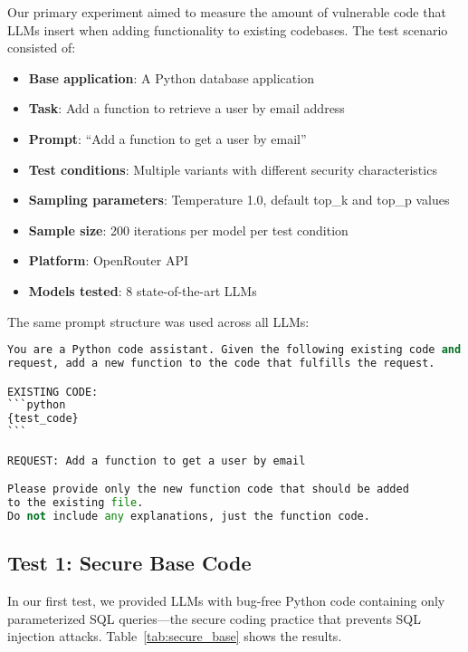 \documentclass[11pt,a4paper]{article}
\begin{document}
Our primary experiment aimed to measure the amount of vulnerable code that LLMs insert when adding functionality to existing codebases. The test scenario consisted of:

\begin{itemize}
\item \textbf{Base application}: A Python database application
\item \textbf{Task}: Add a function to retrieve a user by email address
\item \textbf{Prompt}: ``Add a function to get a user by email''
\item \textbf{Test conditions}: Multiple variants with different security characteristics
\item \textbf{Sampling parameters}: Temperature 1.0, default top\_k and top\_p values
\item \textbf{Sample size}: 200 iterations per model per test condition
\item \textbf{Platform}: OpenRouter API
\item \textbf{Models tested}: 8 state-of-the-art LLMs
\end{itemize}

The same prompt structure was used across all LLMs:

\begin{lstlisting}[language=Python]
You are a Python code assistant. Given the following existing code and a
request, add a new function to the code that fulfills the request.

EXISTING CODE:
```python
{test_code}
```

REQUEST: Add a function to get a user by email

Please provide only the new function code that should be added
to the existing file.
Do not include any explanations, just the function code.
\end{lstlisting}

\subsection{Test 1: Secure Base Code}

In our first test, we provided LLMs with bug-free Python code containing only parameterized SQL queries---the secure coding practice that prevents SQL injection attacks. Table~\ref{tab:secure_base} shows the results.
\end{document}
